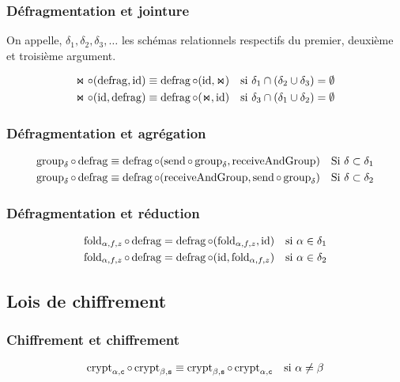 \subsubsection*{Défragmentation et jointure}
On appelle,
$\delta_1, \delta_2, \delta_3, \dots$ 
les schémas relationnels respectifs
du premier, deuxième et troisième argument.

\begin{align*}
\Join \circ (\operatorname{defrag}, \operatorname{id})
& \equiv
\operatorname{defrag} \circ (\operatorname{id}, \Join)
& \text{si $\delta_1 \cap (\delta_2 \cup \delta_3) = \emptyset$} \\
\Join \circ (\operatorname{id}, \operatorname{defrag})
& \equiv
\operatorname{defrag} \circ (\Join, \operatorname{id})
& \text{si $\delta_3 \cap (\delta_1 \cup \delta_2) = \emptyset$} 
\end{align*}

\subsubsection*{Défragmentation et agrégation}
\args
\begin{align*}
\operatorname{group}_{\delta} \circ \operatorname{defrag} 
& \equiv \operatorname{defrag} \circ (\operatorname{send}\circ\operatorname{group}_{\delta}, \operatorname{receiveAndGroup})
& \text{Si $\delta \subset \delta_1$} \\
\operatorname{group}_{\delta} \circ \operatorname{defrag} 
& \equiv \operatorname{defrag} \circ (\operatorname{receiveAndGroup}, \operatorname{send}\circ\operatorname{group}_{\delta})
& \text{Si $\delta \subset \delta_2$} 
\end{align*}

\subsubsection*{Défragmentation et réduction}
\args
\begin{align*}
\operatorname{fold}_{\alpha, f, z} \circ \operatorname{defrag}
& = \operatorname{defrag} \circ (\operatorname{fold}_{\alpha, f, z}, \operatorname{id})
& \text{si $\alpha \in \delta_1$} \\
\operatorname{fold}_{\alpha, f, z} \circ \operatorname{defrag}
& = \operatorname{defrag} \circ (\operatorname{id}, \operatorname{fold}_{\alpha, f, z})
& \text{si $\alpha \in \delta_2$}
\end{align*}

\subsection*{Lois de chiffrement}
\subsubsection*{Chiffrement et chiffrement}
\begin{align*}
\operatorname{crypt}_{\alpha , \text{\ttfamily c}} \circ \operatorname{crypt}_{\beta , \text{\ttfamily s}}
& \equiv \operatorname{crypt}_{\beta , \text{\ttfamily s}} \circ \operatorname{crypt}_{\alpha , \text{\ttfamily c}}
& \text{si $\alpha \neq \beta$}
\end{align*}

